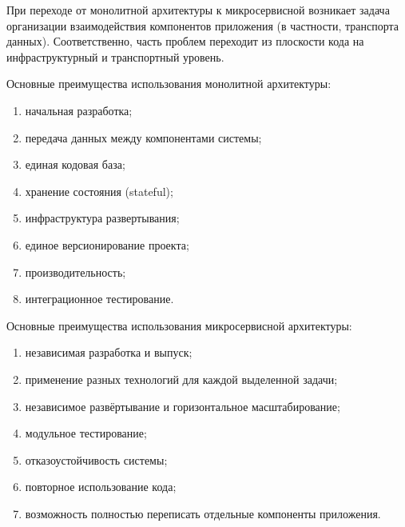 
При переходе от монолитной архитектуры к микросервисной возникает задача организации взаимодействия компонентов приложения (в частности, транспорта данных). Соответственно, часть проблем переходит из плоскости кода на инфраструктурный и транспортный уровень.


Основные преимущества использования монолитной архитектуры:

\begin{enumerate}[label*=\arabic*)]
	\item начальная разработка;
	\item передача данных между компонентами системы;
	\item единая кодовая база; %
	\item хранение состояния (stateful);
	\item инфраструктура развертывания; %
	\item единое версионирование проекта;
	\item производительность; %
	\item интеграционное тестирование.
\end{enumerate}

Основные преимущества использования микросервисной архитектуры:

\begin{enumerate}[label*=\arabic*)]
	\item независимая разработка и выпуск; %
	\item применение разных технологий для каждой выделенной задачи;
	\item независимое развёртывание и горизонтальное масштабирование; %
	\item модульное тестирование; %
	\item отказоустойчивость системы; %
	\item повторное использование кода; %
	\item возможность полностью переписать отдельные компоненты приложения. %
\end{enumerate}

